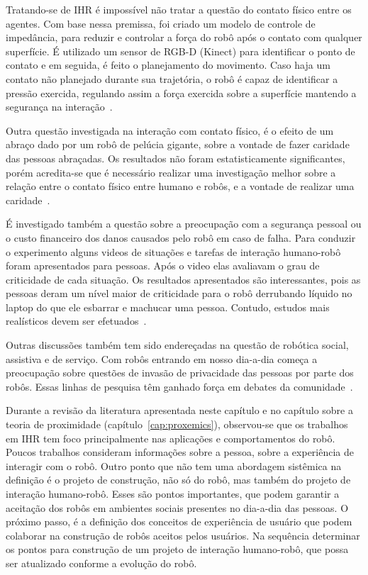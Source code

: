 Tratando-se de IHR é impossível não tratar a questão do contato físico entre os agentes. Com base nessa premissa, foi criado um modelo de controle de impedância, para reduzir e controlar a força do robô após o contato com qualquer superfície. É utilizado um sensor de RGB-D (Kinect) para identificar o ponto de contato e em seguida, é feito o planejamento do movimento. Caso haja um contato não planejado durante sua trajetória, o robô é capaz de identificar a pressão exercida, regulando assim a força exercida sobre a superfície mantendo a segurança na interação~\cite{magrini:2015}.

Outra questão investigada na interação com contato físico, é o efeito de um abraço dado por um robô de pelúcia gigante, sobre a vontade de fazer caridade das pessoas abraçadas. Os resultados não foram estatisticamente significantes, porém acredita-se que é necessário realizar uma investigação melhor sobre a relação entre o contato físico entre humano e robôs, e a vontade de realizar uma caridade~\cite{nakata:2017}.

É investigado também a questão sobre a preocupação com a segurança pessoal ou o custo financeiro dos danos causados pelo robô em caso de falha. Para conduzir o experimento alguns videos de situações e tarefas de interação humano-robô foram apresentados para pessoas. Após o video elas avaliavam o grau de criticidade de cada situação.
Os resultados apresentados são interessantes, pois as pessoas deram um nível maior de criticidade para o robô derrubando líquido no laptop do que ele esbarrar e machucar uma pessoa. Contudo, estudos mais realísticos devem ser efetuados~\cite{adubor:2017}.

Outras discussões também tem sido endereçadas na questão de robótica social, assistiva e de serviço. Com robôs entrando em nosso dia-a-dia começa a preocupação sobre questões de invasão de privacidade das pessoas por parte dos robôs. Essas linhas de pesquisa têm ganhado força em debates da comunidade~\cite{rueben:2017}.

Durante a revisão da literatura apresentada neste capítulo e no capítulo sobre a teoria de proximidade (capítulo~\ref{cap:proxemics}), observou-se que os trabalhos em IHR tem foco principalmente nas aplicações e comportamentos do robô. Poucos trabalhos consideram informações sobre a pessoa, sobre a experiência de interagir com o robô. Outro ponto que não tem uma abordagem sistêmica na definição é o projeto de construção, não só do robô, mas também do projeto de interação humano-robô. Esses são pontos importantes, que podem garantir a aceitação dos robôs em ambientes sociais presentes no dia-a-dia das pessoas. O próximo passo, é a definição dos conceitos de experiência de usuário que podem colaborar na construção de robôs aceitos pelos usuários. Na sequência determinar os pontos para construção de um projeto de interação humano-robô, que possa ser atualizado conforme a evolução do robô.

